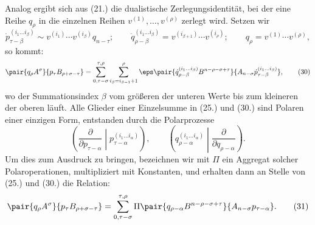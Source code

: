Analog ergibt sich aus (21.) die dualistische Zerlegungsidentit\"at, bei der eine Reihe $q_\rho$ in die einzelnen Reihen $v^{(1)},\ldots,v^{(\rho)}$ zerlegt wird. Setzen wir
\begin{equation}
 \dot p_{\tau-\beta}^{(i_1\ldots i_\beta)}\sim v^{(i_1)}\cdots v^{(i_\beta)}q_{n-\tau};\qquad
 \dot q_{\rho-\beta}^{(i_1\ldots i_\beta)}=v^{(i_{\beta+1})}\cdots v^{(i_\rho)};\qquad
 q_\rho=v^{(1)}\cdots v^{(\rho)},
\tag{29}
\end{equation}
so kommt:
\begin{equation}
 \pair{q_\rho A^\sigma}{p_\tau B_{\rho+\sigma-\tau}}
 =\sum_{\substack{0,\tau-\sigma}}^{\substack{\tau,\rho}}
   \sum_{i_\beta=i_{\beta-1}+1}^{\rho}\eps
\pair{\dot q_{\rho-\beta}^{(i_1\ldots i_\beta)}B^{n-\rho-\sigma+\tau}}{A_{n-\sigma}\dot p_{\tau-\beta}^{(i_1\ldots i_\beta)}} ,
\tag{30}
\end{equation}
wo der Summationsindex $\beta$ vom gr\"o\ss eren der unteren Werte bis zum kleineren der oberen l\"auft. Alle Glieder einer Einzelsumme in (25.) und (30.) sind Polaren einer einzigen Form, entstanden durch die Polarprozesse
\[
\left(\frac{\partial}{\partial p_{\tau-\alpha}}\middle|p_{\tau-\alpha}^{(i_1\ldots i_\alpha)}\right),\qquad
\left(q_{\rho-\alpha}^{(i_1\ldots i_\alpha)}\middle|\frac{\partial}{\partial q_{\rho-\alpha}}\right).
\]
Um dies zum Ausdruck zu bringen, bezeichnen wir mit $\Pi$ ein Aggregat solcher Polaroperationen, multipliziert mit Konstanten, und erhalten dann an Stelle von (25.) und (30.) die Relation:
\begin{equation}
 \pair{q_\rho A^\sigma}{p_\tau B_{\rho+\sigma-\tau}}
 =\sum_{\substack{0,\tau-\sigma}}^{\substack{\tau,\rho}}
 \Pi\pair{q_{\rho-\alpha}B^{n-\rho-\sigma+\tau}}{A_{n-\sigma}p_{\tau-\alpha}}.
\tag{31}
\end{equation}
